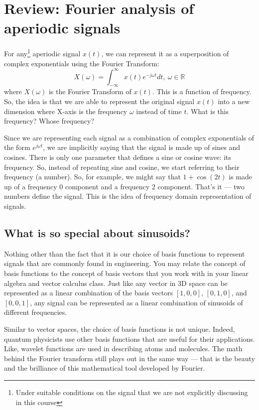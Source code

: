 \documentclass{ee102_notes}
\begin{document}
\section{Review: Fourier analysis of aperiodic signals}
For any\footnote{Under suitable conditions on the signal that we are not explicitly discussing in this course} aperiodic signal $x(t)$, we can represent it as a superposition of complex exponentials using the Fourier Transform:
\[
X(\omega) = \int_{-\infty}^{\infty} x(t) e^{-j \omega t} dt, \: \omega \in \mathbb{R}
\]
where $X(\omega)$ is the Fourier Transform of $x(t)$. This is a function of frequency. So, the idea is that we are able to represent the original signal $x(t)$ into a new dimension where X-axis is the frequency $\omega$ instead of time $t$. What is this frequency? Whose frequency?

Since we are representing each signal as a combination of complex exponentials of the form $e^{j \omega t}$, we are implicitly saying that the signal is made up of sines and cosines. There is only one parameter that defines a sine or cosine wave: its frequency. So, instead of repeating sine and cosine, we start referring to their frequency (a number). So, for example, we might say that $1 + \cos(2t)$ is made up of a frequency 0 component and a frequency 2 component. That's it --- two numbers define the signal. This is the idea of frequency domain representation of signals.

\subsection{What is so special about sinusoids?}
Nothing other than the fact that it is our choice of basis functions to represent signals that are commonly found in engineering. You may relate the concept of basis functions to the concept of basis vectors that you work with in your linear algebra and vector calculus class. Just like any vector in 3D space can be represented as a linear combination of the basis vectors $[1, 0, 0]$, $[0, 1, 0]$, and $[0, 0, 1]$, any signal can be represented as a linear combination of sinusoids of different frequencies.

Similar to vector spaces, the choice of basis functions is not unique. Indeed, quantum physicists use other basis functions that are useful for their applications. Like, wavelet functions are used in describing atoms and molecules. The math behind the Fourier transform still plays out in the same way --- that is the beauty and the brilliance of this mathematical tool developed by Fourier.
\end{document}
